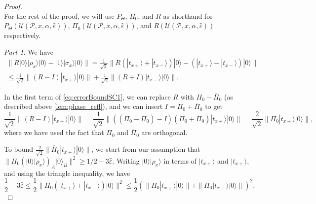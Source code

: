 \documentclass[cleveref, autoref, thm-restate,11pt]{article}
\theoremstyle{definition}
\newcommand{\sop}[1]{{\mathcal #1}}
\newcommand{\ket}[1]{|#1\rangle}
\newcommand{\Up}[4]{{\sop U({#1},{#2},{#3},{#4})}}
\begin{document}
\begin{proof}
~\\
For the rest of the proof, we will use $P_\Theta$, $\Pi_0$, 
and $R$ as shorthand for $P_\Theta(\Up{\mathscr{P}}{x}{\alpha}{\hat{\varepsilon}})$, 
$\Pi_0(\Up{\mathscr{P}}{x}{\alpha}{\hat{\varepsilon}})$, and
 $R(\Up{\mathscr{P}}{x}{\alpha}{\hat{\varepsilon}})$ respectively.

\noindent\textit{Part 1:} We have 
\begin{align}
\|R\ket{0}\ket{\rho_x}\ket{0}-\ket{1}\ket{\sigma_x}\ket{0}\|=
\frac{1}{\sqrt{2}}\|R(\ket{t_{x+}}+\ket{t_{x-}})\ket{0}-(\ket{t_{x+}}-\ket{t_{x-}})\ket{0}\|\nonumber\\
\leq \frac{1}{\sqrt{2}}\|(R-I)\ket{t_{x+}}\ket{0}\|+\frac{1}{\sqrt{2}}\|(R+I)\ket{t_{x-}}\ket{0}\|.\label{eq:errorBoundSC1}
\end{align}

In the first term of \cref{eq:errorBoundSC1}, we can replace $R$ with $\Pi_0-\overline{\Pi}_0$ (as described above \cref{lem:phase_refl}), and we can insert $I=\Pi_0+\overline{\Pi}_0$ to get
\begin{equation}\label{eq:equation_interrupted}
\frac{1}{\sqrt{2}}\|(R-I)\ket{t_{x+}}\ket{0}\|=\frac{1}{\sqrt{2}}\|((\Pi_0-\overline{\Pi}_0)-I)(\Pi_0+\overline{\Pi}_0)\ket{t_{x+}}\ket{0}\|=\frac{2}{\sqrt{2}}\|\overline{\Pi}_0\ket{t_{x+}}\ket{0}\|,
\end{equation}
where we have used the fact that $\Pi_0$ and $\overline{\Pi}_0$ are orthogonal.

To bound $\frac{2}{\sqrt{2}}\|\overline{\Pi}_0\ket{t_{x+}}\ket{0}\|$, we start from our assumption that $\|\Pi_0(\ket{0}\ket{\rho_x})_A\ket{0}_B\|^2\geq 1/2-3\hat{\varepsilon}$. Writing $\ket{0}\ket{\rho_x}$ in terms of $\ket{t_{x+}}$ and $\ket{t_{x+}}$, and using the triangle inequality, we have
\begin{equation}
\frac{1}{2}-3\hat{\varepsilon}\leq \frac{1}{2}\|\Pi_0(\ket{t_{x+}}+\ket{t_{x-}})\ket{0}\|^2
\leq 
\frac{1}{2}\left(\|\Pi_0\ket{t_{x+}}\ket{0}\|+\|\Pi_0\ket{t_{x-}}\ket{0}\|\right)^2\label{line1}.
\end{equation}



\end{proof}
\end{document}
